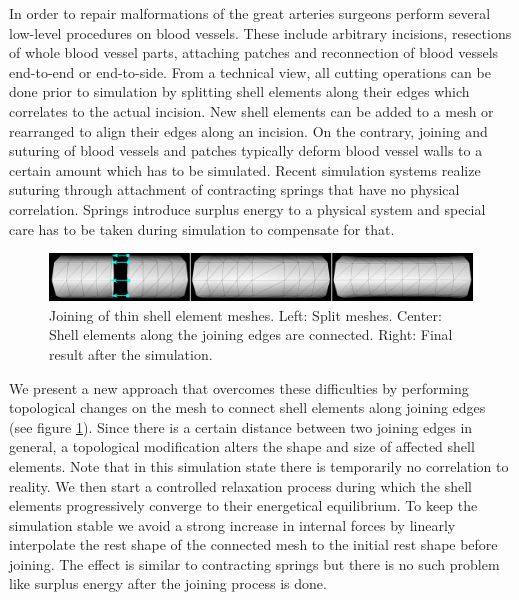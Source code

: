 In order to repair malformations of the great arteries surgeons perform several low-level procedures on blood vessels. These include arbitrary incisions, resections of whole blood vessel parts, attaching patches and reconnection of blood vessels end-to-end or end-to-side. From a technical view, all cutting operations can be done prior to simulation by splitting shell elements along their edges which correlates to the actual incision. New shell elements can be added to a mesh or rearranged to align their edges along an incision. On the contrary, joining and suturing of blood vessels and patches typically deform blood vessel walls to a certain amount which has to be simulated. Recent simulation systems \cite{Sorensen2006,Mosegaard2004,Li2009} realize suturing through attachment of contracting springs that have no physical correlation. Springs introduce surplus energy to a physical system and special care has to be taken during simulation to compensate for that.

\begin{figure}[tbh]
\begin{center}
\includegraphics[width=\columnwidth]{img/new-joining.png}
\end{center}
\caption{Joining of thin shell element meshes. Left: Split meshes. Center: Shell elements along the joining edges are connected. Right: Final result after the simulation.}
\label{fig-JoiningVessels}
\end{figure}

We present a new approach that overcomes these difficulties by performing topological changes on the mesh to connect shell elements along joining edges (see figure \ref{fig-JoiningVessels}). Since there is a certain distance between two joining edges in general, a topological modification alters the shape and size of affected shell elements. Note that in this simulation state there is temporarily no correlation to reality. We then start a controlled relaxation process during which the shell elements progressively converge to their energetical equilibrium. To keep the simulation stable we avoid a strong increase in internal forces by linearly interpolate the rest shape of the connected mesh to the initial rest shape before joining. The effect is similar to contracting springs but there is no such problem like surplus energy after the joining process is done.

